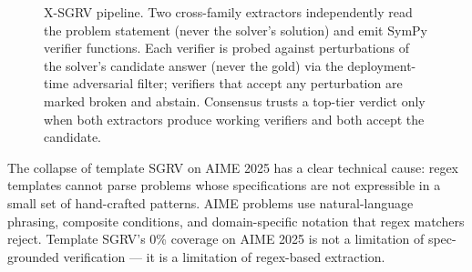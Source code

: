 \documentclass{article}
\begin{document}
\begin{figure}[t]
\centering
{}
\caption{X-SGRV pipeline. Two cross-family extractors independently read the problem statement (never the solver's solution) and emit SymPy verifier functions. Each verifier is probed against perturbations of the solver's candidate answer (never the gold) via the deployment-time adversarial filter; verifiers that accept any perturbation are marked broken and abstain. Consensus trusts a top-tier verdict only when both extractors produce working verifiers and both accept the candidate.}
\label{fig:pipeline}
\end{figure}

The collapse of template SGRV on AIME 2025 has a clear technical cause: regex templates cannot parse problems whose specifications are not expressible in a small set of hand-crafted patterns. AIME problems use natural-language phrasing, composite conditions, and domain-specific notation that regex matchers reject. Template SGRV's 0\% coverage on AIME 2025 is not a limitation of spec-grounded verification --- it is a limitation of regex-based extraction.
\end{document}
